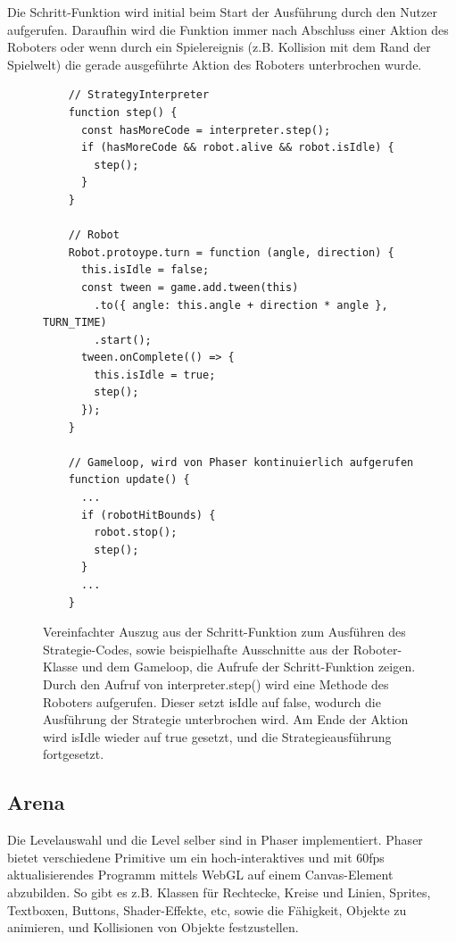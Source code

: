 Die Schritt-Funktion wird initial beim Start der Ausführung durch den Nutzer aufgerufen. Daraufhin
wird die Funktion immer nach Abschluss einer Aktion des Roboters oder wenn durch ein Spielereignis
(z.B. Kollision mit dem Rand der Spielwelt) die gerade ausgeführte Aktion des Roboters unterbrochen
wurde.

\begin{figure}
  \caption{Vereinfachter Auszug aus der Schritt-Funktion zum Ausführen des Strategie-Codes, sowie
  beispielhafte Ausschnitte aus der Roboter-Klasse und dem Gameloop, die Aufrufe der
  Schritt-Funktion zeigen. Durch den Aufruf von interpreter.step() wird eine Methode des Roboters
  aufgerufen. Dieser setzt isIdle auf false, wodurch die Ausführung der Strategie unterbrochen wird.
  Am Ende der Aktion wird isIdle wieder auf true gesetzt, und die Strategieausführung fortgesetzt.}

  \label{interpreter-step}

  \begin{lstlisting}
    // StrategyInterpreter
    function step() {
      const hasMoreCode = interpreter.step();
      if (hasMoreCode && robot.alive && robot.isIdle) {
        step();
      }
    }

    // Robot
    Robot.protoype.turn = function (angle, direction) {
      this.isIdle = false;
      const tween = game.add.tween(this)
        .to({ angle: this.angle + direction * angle }, TURN_TIME)
        .start();
      tween.onComplete(() => {
        this.isIdle = true;
        step();
      });
    }

    // Gameloop, wird von Phaser kontinuierlich aufgerufen
    function update() {
      ...
      if (robotHitBounds) {
        robot.stop();
        step();
      }
      ...
    }
  \end{lstlisting}
\end{figure}


\subsection{Arena}

\label{arena-alt}

Die Levelauswahl und die Level selber sind in Phaser implementiert. Phaser bietet verschiedene
Primitive um ein hoch-interaktives und mit 60fps aktualisierendes Programm mittels WebGL auf einem
Canvas-Element abzubilden. So gibt es z.B. Klassen für Rechtecke, Kreise und Linien, Sprites,
Textboxen, Buttons, Shader-Effekte, etc, sowie die Fähigkeit, Objekte zu animieren, und Kollisionen
von Objekte festzustellen.

